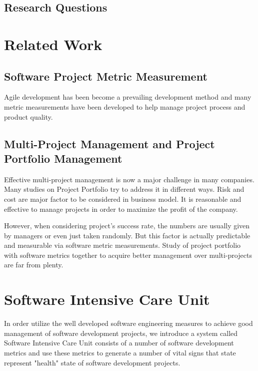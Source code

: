 \section{Research Questions}

\chapter{Related Work}
\section{Software Project Metric Measurement}
Agile development has been become a prevailing development method and many metric measurements have been developed to help manage project process and product quality.

\section{Multi-Project Management and Project Portfolio Management}
Effective multi-project management is now a major challenge in many companies. Many studies on Project Portfolio try to address it in different ways. Risk and cost are major factor to be considered in business model. It is reasonable and effective to manage projects in order to maximize the profit of the company.

However, when considering project's success rate, the numbers are usually given by managers or even just taken randomly. But this factor is actually predictable and measurable via software metric measurements. Study of project portfolio with software metrics together to acquire better management over multi-projects are far from plenty. 

\chapter{Software Intensive Care Unit}
In order utilize the well developed software engineering measures to achieve good management of software development projects, we introduce a system called Software Intensive Care Unit consists of a number of software development metrics and use these metrics to generate a number of vital signs that state represent "health" state of software development projects.

